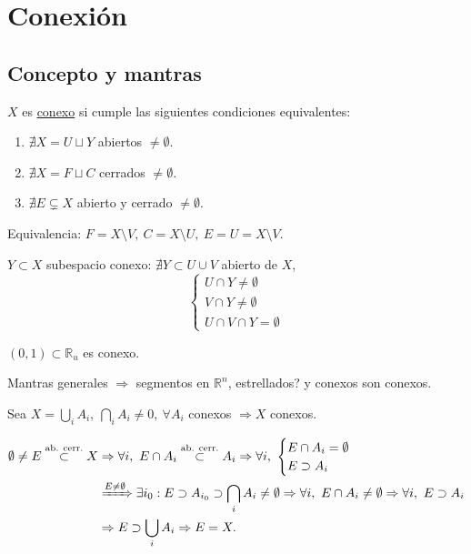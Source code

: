 \chapter{Conexión}%
\label{cha:conexion}
\section{Concepto y mantras}%
\label{sec:concepto_y_mantras_conx}
\begin{defi}
$X$ es \underline{conexo} si cumple las siguientes condiciones equivalentes:
\begin{enumerate}
    \item $\nexists X = U \sqcup Y$ abiertos $\neq \emptyset$.
    \item $\nexists X = F \sqcup C$ cerrados $\neq \emptyset$.
    \item $\nexists E \subsetneq X$ abierto y cerrado $\neq \emptyset$.
\end{enumerate}
\end{defi}
\begin{demo}
Equivalencia: $F = X \setminus V,\ C = X \setminus U,\ E = U = X \setminus V.$
\end{demo}

\begin{obs}
$Y \subset X$ subespacio conexo: $\nexists Y \subset U \cup V$ abierto de $X$, 
\[
\begin{cases}
    U \cap Y \neq \emptyset\\
    V \cap Y \neq \emptyset\\
    U \cap V \cap Y = \emptyset
\end{cases} 
\]
\end{obs}

\begin{ej}[Fundamental]
$\left( 0, 1 \right) \subset \mathbb{R}_u$ es conexo. 

Mantras generales $\Rightarrow$ segmentos en $\mathbb{R}^n$, estrellados? y conexos son conexos.
\end{ej}

\begin{theo} 
Sea $X = \bigcup_{i} A_i,\ \bigcap_{i} A_i \neq 0,\ \forall A_i$ conexos $\Rightarrow X$ conexos.
\end{theo}
\begin{demo}
\begin{align*}
    \emptyset \neq E \stackrel{\text{ab. cerr.}}{\subset} X &\Rightarrow \forall i,\ E \cap A_i \stackrel{\text{ab. cerr.}}{\subset} A_i \Rightarrow \forall i,\ \begin{cases}
        E \cap A_i = \emptyset\\
        E \supset A_i
    \end{cases}\\
    &\xRightarrow{E \neq \emptyset} \exists i_0: E \supset A_{i_0} \supset \bigcap_{i} A_i \neq \emptyset \Rightarrow \forall i,\ E \cap A_i \neq \emptyset \Rightarrow \forall i,\ E \supset A_i\\
    &\Rightarrow E \supset \bigcup_{i} A_i \Rightarrow E = X
.\end{align*}
\end{demo}

